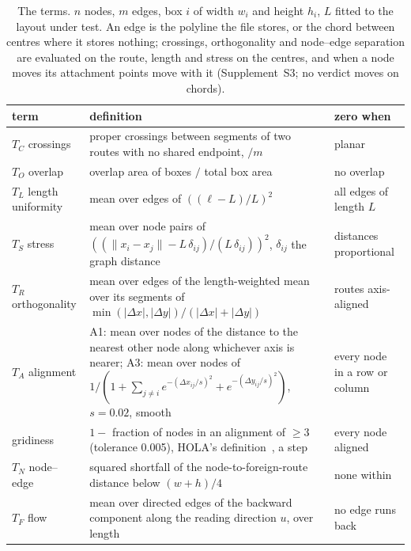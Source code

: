\documentclass[11pt]{article}
\begin{document}
\begin{table}[!htbp]\centering\footnotesize
\begin{tabular}{lp{7.6cm}p{2.6cm}}
\toprule
term & definition & zero when \\
\midrule
$T_C$ crossings & proper crossings between segments of two routes with no shared endpoint, $/m$ & planar \\
$T_O$ overlap & overlap area of boxes $/$ total box area & no overlap \\
$T_L$ length uniformity & mean over edges of $((\ell - L)/L)^2$ & all edges of length $L$ \\
$T_S$ stress & mean over node pairs of $((\|x_i - x_j\| - L\,\delta_{ij})/(L\,\delta_{ij}))^2$, $\delta_{ij}$ the graph distance & distances proportional \\
$T_R$ orthogonality & mean over edges of the length-weighted mean over its segments of $\min(|\Delta x|,|\Delta y|)/(|\Delta x|+|\Delta y|)$ & routes axis-aligned \\
$T_A$ alignment & A1: mean over nodes of the distance to the nearest other node along whichever axis is nearer; A3: mean over nodes of $1/(1 + \sum_{j \ne i} e^{-(\Delta x_{ij}/s)^2} + e^{-(\Delta y_{ij}/s)^2})$, $s = 0.02$, smooth & every node in a row or column \\
gridiness & $1 -$ fraction of nodes in an alignment of $\ge 3$ (tolerance 0.005), HOLA's definition~\cite{hola16}, a step & every node aligned \\
$T_N$ node--edge & squared shortfall of the node-to-foreign-route distance below $(w+h)/4$ & none within \\
$T_F$ flow & mean over directed edges of the backward component along the reading direction $u$, over length & no edge runs back \\
\bottomrule
\end{tabular}
\caption{The terms. $n$ nodes, $m$ edges, box $i$ of width $w_i$ and height $h_i$, $L$
fitted to the layout under test. An edge is the polyline the file stores, or the chord
between centres where it stores nothing; crossings, orthogonality and node--edge
separation are evaluated on the route, length and stress on the centres, and when a node
moves its attachment points move with it (Supplement~S3; no verdict moves on chords).}
\label{tab:terms}
\end{table}
\end{document}
